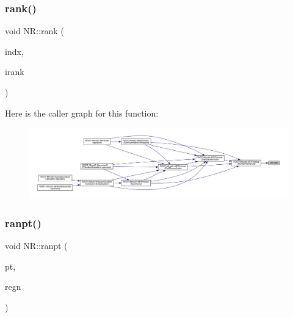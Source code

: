 \mbox{\label{namespaceNR_af609478dc8d3d58e4d09f1f8f8553238}} 
\subsubsection{\texorpdfstring{rank()}{rank()}}
{\footnotesize\ttfamily void N\+R\+::rank (\begin{DoxyParamCaption}\item[{\mbox{\hyperlink{namespaceNR_ae67ce7dc86a8a64a7ce73c3c030ff610}{Vec\+\_\+\+I\+\_\+\+I\+NT}} \&}]{indx,  }\item[{\mbox{\hyperlink{namespaceNR_ade2338f6d53b7da3dd6d1c04804541f2}{Vec\+\_\+\+O\+\_\+\+I\+NT}} \&}]{irank }\end{DoxyParamCaption})}

Here is the caller graph for this function\+:
\nopagebreak
\begin{figure}[H]
\begin{center}
\leavevmode
\includegraphics[width=350pt]{da/d46/namespaceNR_af609478dc8d3d58e4d09f1f8f8553238_icgraph}
\end{center}
\end{figure}
\mbox{\label{namespaceNR_a103ce563920343003034206a38ebdbb7}} 
\subsubsection{\texorpdfstring{ranpt()}{ranpt()}}
{\footnotesize\ttfamily void N\+R\+::ranpt (\begin{DoxyParamCaption}\item[{\mbox{\hyperlink{namespaceNR_a970094d23441f8ef6a45282a7eb2103d}{Vec\+\_\+\+O\+\_\+\+DP}} \&}]{pt,  }\item[{\mbox{\hyperlink{namespaceNR_a9f943da53862537c552e2a770cb170ae}{Vec\+\_\+\+I\+\_\+\+DP}} \&}]{regn }\end{DoxyParamCaption})}

\mbox{\label{namespaceNR_acf23dccda6fe2ebd6630856bdb24a274}} 
